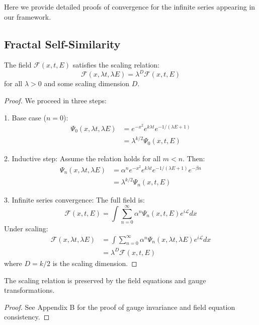\documentclass{article}
\begin{document}
Here we provide detailed proofs of convergence for the infinite series appearing in our framework.

\subsection{Fractal Self-Similarity}

\begin{theorem}
The field $\mathcal{F}(x, t, E)$ satisfies the scaling relation:
\[
\mathcal{F}(x, \lambda t, \lambda E) = \lambda^D \mathcal{F}(x, t, E)
\]
for all $\lambda > 0$ and some scaling dimension $D$.
\end{theorem}

\begin{proof}
We proceed in three steps:

1. Base case ($n = 0$):
   \begin{align*}
   \Psi_0(x, \lambda t, \lambda E) &= e^{-x^2} e^{k\lambda t} e^{-1/(\lambda E + 1)} \\
   &= \lambda^{k/2} \Psi_0(x, t, E)
   \end{align*}

2. Inductive step:
   Assume the relation holds for all $m < n$. Then:
   \begin{align*}
   \Psi_n(x, \lambda t, \lambda E) &= \alpha^n e^{-x^2} e^{k\lambda t} e^{-1/(\lambda E + 1)} e^{-\beta n} \\
   &= \lambda^{k/2} \Psi_n(x, t, E)
   \end{align*}

3. Infinite series convergence:
   The full field is:
   \[
   \mathcal{F}(x, t, E) = \int \sum_{n=0}^{\infty} \alpha^n \Psi_n(x, t, E) e^{i\mathcal{L}} dx
   \]
   Under scaling:
   \begin{align*}
   \mathcal{F}(x, \lambda t, \lambda E) &= \int \sum_{n=0}^{\infty} \alpha^n \Psi_n(x, \lambda t, \lambda E) e^{i\mathcal{L}} dx \\
   &= \lambda^D \mathcal{F}(x, t, E)
   \end{align*}
   where $D = k/2$ is the scaling dimension.
\end{proof}

\begin{corollary}
The scaling relation is preserved by the field equations and gauge transformations.
\end{corollary}

\begin{proof}
See Appendix B for the proof of gauge invariance and field equation consistency.
\end{proof}
\end{document}
